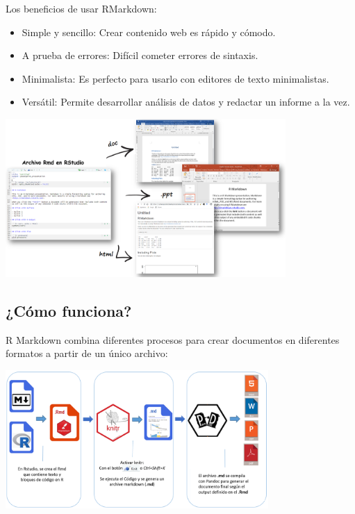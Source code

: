 \documentclass[
]{article}
\providecommand{\tightlist}{%
  \setlength{\itemsep}{0pt}\setlength{\parskip}{0pt}}
\begin{document}
Los beneficios de usar RMarkdown:

\begin{itemize}
\tightlist
\item
  Simple y sencillo: Crear contenido web es rápido y cómodo.
\item
  A prueba de errores: Difícil cometer errores de sintaxis.
\item
  Minimalista: Es perfecto para usarlo con editores de texto
  minimalistas.
\item
  Versátil: Permite desarrollar análisis de datos y redactar un informe
  a la vez.
\end{itemize}

\includegraphics[width=0.8\textwidth,height=\textheight]{images/formatexport.png}

\hypertarget{cuxf3mo-funciona}{%
\subsection{¿Cómo funciona?}\label{cuxf3mo-funciona}}

R Markdown combina diferentes procesos para crear documentos en
diferentes formatos a partir de un único archivo:

\includegraphics[width=0.75\textwidth,height=\textheight]{images/workflow.png}
\end{document}
